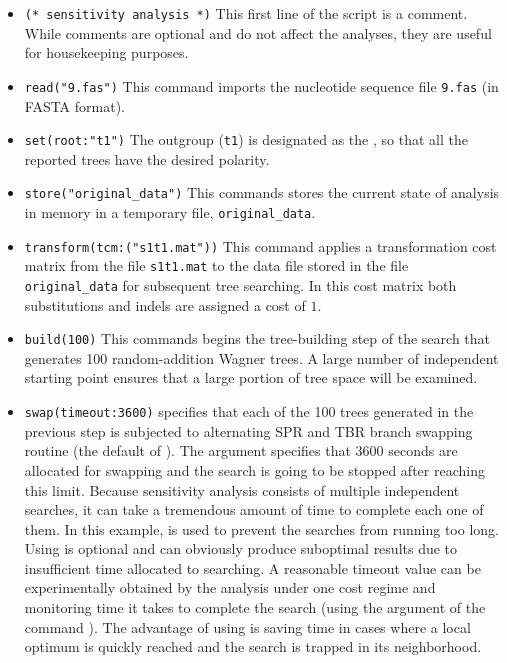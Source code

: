 \begin{itemize}
\item \texttt{(* sensitivity analysis *)} This first line of the script is a comment. While comments are optional and do not
 affect the analyses, they are useful for housekeeping purposes.
\item \texttt{read("9.fas")} This command imports the nucleotide sequence file \texttt{9.fas} (in FASTA format).
\item \texttt{set(root:"t1")} The outgroup (\texttt{t1}) is designated as the , so that all the 
reported trees have the desired polarity.
\item \texttt{store("original\_data")} This commands stores the current state of analysis in memory in a temporary file, 
\texttt{original\_data}.
\item \texttt{transform(tcm:("s1t1.mat"))} This command applies a transformation cost matrix from the file \texttt{s1t1.mat} to 
the data file stored in the file \texttt{original\_data} for subsequent tree searching. In this cost matrix both substitutions 
and indels are assigned a cost of $ 1 $.
\item \texttt{build(100)} This commands begins the tree-building step of the search that generates 100 random-addition 
Wagner trees. A large number of independent starting point ensures that a large portion of tree space will be 
examined.
\item \texttt{swap(timeout:3600)}  specifies that each of the 100 trees generated in the previous step is 
subjected to alternating SPR and TBR branch swapping routine (the default of \poy). The argument 
 specifies that 3600 seconds are allocated for swapping and the search is going to be stopped 
after reaching this limit. Because sensitivity analysis consists of multiple independent searches, it can take a 
tremendous amount of time to complete each one of them. In this example,  is used to prevent 
the searches from running too long. Using  is optional and can obviously produce suboptimal 
results due to insufficient time allocated to searching. A reasonable timeout value can be experimentally obtained by 
the analysis under one cost regime and monitoring time it takes to complete the search (using the argument 
 of the command ). The advantage of using  is saving 
time in cases where a local optimum is quickly reached and the search is trapped in its neighborhood.

\end{itemize}
